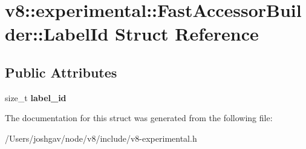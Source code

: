 \hypertarget{structv8_1_1experimental_1_1_fast_accessor_builder_1_1_label_id}{}\section{v8\+:\+:experimental\+:\+:Fast\+Accessor\+Builder\+:\+:Label\+Id Struct Reference}
\label{structv8_1_1experimental_1_1_fast_accessor_builder_1_1_label_id}
\subsection*{Public Attributes}
\begin{DoxyCompactItemize}
\item 
size\+\_\+t {\bfseries label\+\_\+id}\hypertarget{structv8_1_1experimental_1_1_fast_accessor_builder_1_1_label_id_abdf1bdba753c7de77ad908dc75c8c58b}{}\label{structv8_1_1experimental_1_1_fast_accessor_builder_1_1_label_id_abdf1bdba753c7de77ad908dc75c8c58b}

\end{DoxyCompactItemize}


The documentation for this struct was generated from the following file\+:\begin{DoxyCompactItemize}
\item 
/\+Users/joshgav/node/v8/include/v8-\/experimental.\+h\end{DoxyCompactItemize}
